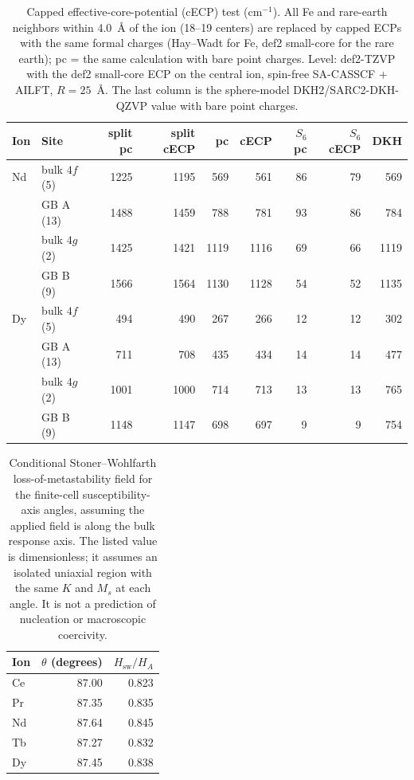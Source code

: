 \begin{table}[H]
\centering
\caption{Capped effective-core-potential (cECP) test (cm$^{-1}$). All Fe and rare-earth neighbors within 4.0~\AA{} of the ion (18--19 centers) are replaced by capped ECPs with the same formal charges (Hay--Wadt for Fe, def2 small-core for the rare earth); pc = the same calculation with bare point charges. Level: def2-TZVP with the def2 small-core ECP on the central ion, spin-free SA-CASSCF + AILFT, $R = 25$~\AA. The last column is the sphere-model DKH2/SARC2-DKH-QZVP value with bare point charges.}\label{tab:S8}
\small
\begin{tabular}{llrrrrrrr}
\toprule
Ion & Site & split pc & split cECP & \Atwo{} pc & \Atwo{} cECP & $S_6$ pc & $S_6$ cECP & \Atwo{} DKH \\
\midrule
Nd & bulk $4f$ (5) & 1225 & 1195 & 569 & 561 & 86 & 79 & 569 \\
 & GB A (13) & 1488 & 1459 & 788 & 781 & 93 & 86 & 784 \\
 & bulk $4g$ (2) & 1425 & 1421 & 1119 & 1116 & 69 & 66 & 1119 \\
 & GB B (9) & 1566 & 1564 & 1130 & 1128 & 54 & 52 & 1135 \\
Dy & bulk $4f$ (5) & 494 & 490 & 267 & 266 & 12 & 12 & 302 \\
 & GB A (13) & 711 & 708 & 435 & 434 & 14 & 14 & 477 \\
 & bulk $4g$ (2) & 1001 & 1000 & 714 & 713 & 13 & 13 & 765 \\
 & GB B (9) & 1148 & 1147 & 698 & 697 & 9 & 9 & 754 \\
\bottomrule
\end{tabular}
\end{table}

\begin{table}[H]
\centering
\footnotesize
\setlength{\tabcolsep}{4pt}
\caption{Conditional Stoner--Wohlfarth loss-of-metastability field for the finite-cell susceptibility-axis angles, assuming the applied field is along the bulk response axis. The listed value is dimensionless; it assumes an isolated uniaxial region with the same $K$ and $M_s$ at each angle. It is not a prediction of nucleation or macroscopic coercivity.}\label{tab:S9}
\begin{tabular}{lrr}
\toprule
Ion & $\theta$ (degrees) & $H_{\mathrm{sw}}/H_A$ \\
\midrule
Ce & 87.00 & 0.823 \\
Pr & 87.35 & 0.835 \\
Nd & 87.64 & 0.845 \\
Tb & 87.27 & 0.832 \\
Dy & 87.45 & 0.838 \\
\bottomrule
\end{tabular}
\end{table}

